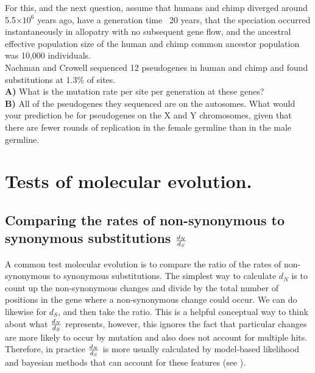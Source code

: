 



\begin{question}
For this, and the next question, assume that humans and chimp diverged
around 5.5$\times 10^6$ years ago, have a generation time ~20 years, that the speciation occurred instantaneously in allopatry with no subsequent gene flow, and the ancestral effective population size of the human and chimp common ancestor population was 10,000 individuals.\\
Nachman and Crowell sequenced 12 pseudogenes in human and chimp and found substitutions at 1.3\% of sites. \\
{\bf A) } What is the mutation rate per site per generation at these genes?\\
{\bf B)} All of the pseudogenes they sequenced are on the autosomes. What
would your prediction be for pseudogenes on the X and Y chromosomes,
given that there are fewer rounds of replication in the female
germline than in the male germline.
\end{question}

\section{Tests of molecular evolution.}

\subsection{Comparing the rates of non-synonymous to synonymous
substitutions $\frac{d_N}{d_S}$}
A common test molecular evolution is to compare the ratio of the rates of non-synonymous to synonymous
substitutions. The simplest way to calculate $d_N$ is to 
count up the non-synonymous changes and divide by the total number of
positions in the gene where a non-synonymous change could occur. We
can do likewise for $d_S$, and then take the ratio. This is a helpful
conceptual way to think about what $\frac{d_N}{d_S}$ represents, however, this
ignores the fact that particular changes are more likely to occur by
mutation and also does not account for multiple hits. Therefore, in
practice $\frac{d_N}{d_S}$ is more usually calculated by model-based
likelihood and bayesian methods
that can account for these features (see ). 

